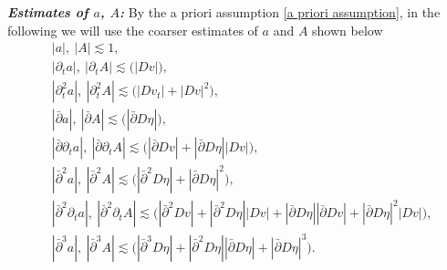 \documentclass[12pt,a4paper]{amsart}
\numberwithin{equation}{section}
\theoremstyle{plain}
\theoremstyle{definition}
\newcommand{\bpartial}{\bar{\partial}}
\begin{document}
\textsl{\textbf{Estimates of $a$, $A$:}}
By the a priori assumption \eqref{a priori assumption}, in the following we will use the coarser estimates of $a$ and $A$ shown below
\begin{align*}
& |a|,\ |A|\lesssim 1, \\
& |\partial_t a |,\ |\partial_t A |\lesssim  \Big(|Dv| \Big),\\
& |\partial_t^2 a |,\ |\partial_t^2 A |\lesssim \Big( |Dv_t|+|Dv|^2\Big),\\
& |\bpartial a |,\ |\bpartial A |\lesssim  \Big( |\bpartial  D \eta|\Big),\\
& |\bpartial\partial_t a |,\ |\bpartial\partial_t A |\lesssim  \Big(|\bpartial  D v|+|\bpartial D\eta| |Dv|\Big),\\
& |\bpartial^2 a |,\ |\bpartial^2 A |\lesssim  \Big(|\bpartial^2  D \eta| + |\bpartial  D \eta|^2\Big),\\
& |\bpartial^2 \partial_t a|,\ |\bpartial^2\partial_t A |\lesssim  \Big( |\bpartial^2   D v| +|\bpartial^2   D \eta| |Dv|  + |\bpartial  D \eta| |\bpartial  D v|+|\bpartial  D \eta|^2 |Dv|\Big),\\
&|\bpartial^3 a|,\ |\bpartial^3 A |\lesssim  \Big( |\bpartial^3   D \eta| +|\bpartial^2   D \eta| |\bpartial D \eta| +|\bpartial  D \eta|^3 \Big).
\end{align*}
\end{document}
